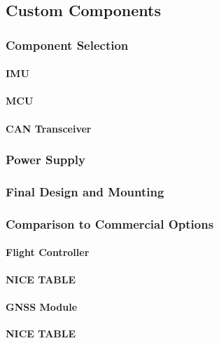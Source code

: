 \subsection{Custom Components}

\subsubsection{Component Selection}
\paragraph{\gls{IMU}}
\paragraph{\gls{MCU}}
\paragraph{\gls{CAN} Transceiver}

\subsubsection{Power Supply}
\paragraph{}

\subsubsection{Final Design and Mounting}
\paragraph{}

\subsubsection{Comparison to Commercial Options}
\paragraph{Flight Controller}
\textbf{NICE TABLE}
\paragraph{\gls{GNSS} Module}
\textbf{NICE TABLE}
